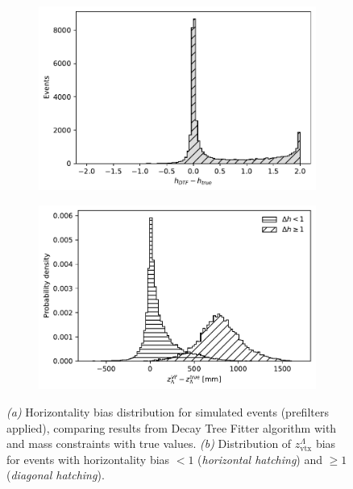 \begin{figure}[t]
	\centering
	\begin{subfigure}{.45\textwidth}
		\includegraphics[width=\textwidth]{graphics/04-event_selection/Lambda_horizontality_bias.pdf}
		\caption{}
	\end{subfigure}
	\begin{subfigure}{.45\textwidth}
		\includegraphics[width=\textwidth]{graphics/04-event_selection/lambda_endvertex_z_bias_vs_horizontality_bias.pdf}
		\caption{}
	\end{subfigure}
	\caption{\textit{(a)} Horizontality bias distribution for simulated \demonstratorshort events (prefilters applied), comparing results from Decay Tree Fitter algorithm with \jpsi and \lz mass constraints with true values. \textit{(b)} Distribution of $z_\text{vtx}^\Lambda$ bias for events with horizontality bias $<1$ (\textit{horizontal hatching}) and $\geq 1$ (\textit{diagonal hatching}).}
\end{figure}

